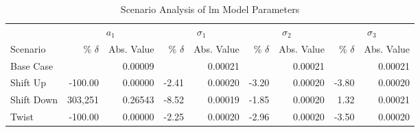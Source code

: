 \begin{table}[H]
	\centering
	\setlength{\tabcolsep}{5pt}
	\caption{Scenario Analysis of \ac{lm} Model Parameters}
	\label{tab:scenario_analysis_part_lm}
	\begin{threeparttable}
		\begin{tabular}{l *{4}{rr}}
			\toprule
			           & \multicolumn{2}{c}{$a_1$} & \multicolumn{2}{c}{$\sigma_1$} & \multicolumn{2}{c}{$\sigma_2$} & \multicolumn{2}{c}{$\sigma_3$}                                                       \\
			\cmidrule(lr){2-3} \cmidrule(lr){4-5} \cmidrule(lr){6-7} \cmidrule(lr){8-9}
			Scenario   & \% $\delta$               & Abs. Value                     & \% $\delta$                    & Abs. Value                     & \% $\delta$ & Abs. Value & \% $\delta$ & Abs. Value \\
			\midrule

			Base Case  &                           & 0.00009                        &                                & 0.00021                        &             & 0.00021    &             & 0.00021    \\
			Shift Up   & -100.00                   & 0.00000                        & -2.41                          & 0.00020                        & -3.20       & 0.00020    & -3.80       & 0.00020    \\
			Shift Down & 303,251                   & 0.26543                        & -8.52                          & 0.00019                        & -1.85       & 0.00020    & 1.32        & 0.00021    \\
			Twist      & -100.00                   & 0.00000                        & -2.25                          & 0.00020                        & -2.96       & 0.00020    & -3.50       & 0.00020    \\
			\bottomrule
		\end{tabular}
	\end{threeparttable}
\end{table}

